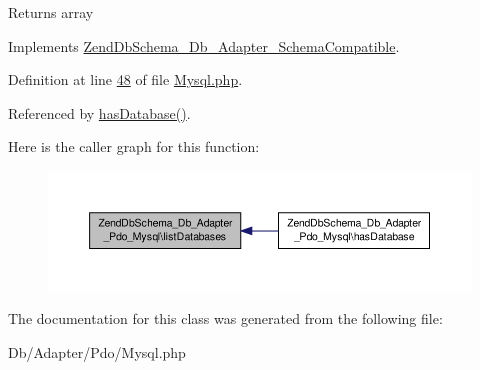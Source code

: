 \begin{DoxyReturn}{Returns}
array 
\end{DoxyReturn}


Implements \hyperlink{interfaceZendDbSchema__Db__Adapter__SchemaCompatible_a4c7951a6b329d2106502dbbaae82e51d}{Zend\-Db\-Schema\-\_\-\-Db\-\_\-\-Adapter\-\_\-\-Schema\-Compatible}.



Definition at line \hyperlink{Mysql_8php_source_l00048}{48} of file \hyperlink{Mysql_8php_source}{Mysql.\-php}.



Referenced by \hyperlink{Mysql_8php_source_l00038}{has\-Database()}.



Here is the caller graph for this function\-:\nopagebreak
\begin{figure}[H]
\begin{center}
\leavevmode
\includegraphics[width=350pt]{classZendDbSchema__Db__Adapter__Pdo__Mysql_afa634812c724a9fcf35aeea357707d64_icgraph}
\end{center}
\end{figure}




The documentation for this class was generated from the following file\-:\begin{DoxyCompactItemize}
\item 
Db/\-Adapter/\-Pdo/Mysql.\-php\end{DoxyCompactItemize}
